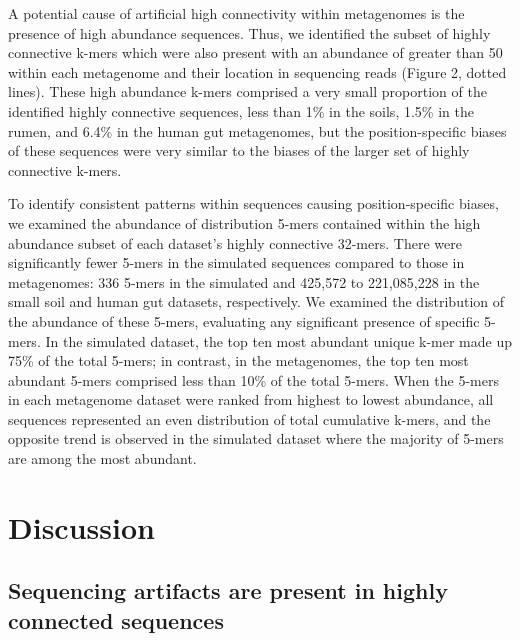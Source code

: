\documentclass[10pt]{article}
\begin{document}
A potential cause of artificial high connectivity within metagenomes is the presence of high abundance sequences.  Thus, we identified the subset of highly connective k-mers which were also present with an abundance of greater than 50 within each metagenome and their location in sequencing reads (Figure 2, dotted lines).   These high abundance k-mers comprised a very small proportion of the identified highly connective sequences, less than 1\% in the soils, 1.5\% in the rumen, and 6.4\% in the human gut metagenomes, but the position-specific biases of these sequences were very similar to the biases of the larger set of highly connective k-mers.

To identify consistent patterns within sequences causing position-specific biases, we examined the abundance of distribution 5-mers contained within the high abundance subset of each dataset's highly connective 32-mers.   There were significantly fewer 5-mers in the simulated sequences compared to those in metagenomes: 336 5-mers in the simulated and 425,572 to 221,085,228 in the small soil and human gut datasets, respectively.  We examined the distribution of the abundance of these 5-mers, evaluating any significant presence of specific 5-mers.  In the simulated dataset, the top ten most abundant unique k-mer made up 75\% of the total 5-mers; in contrast, in the metagenomes, the top ten most abundant 5-mers comprised less than 10\% of the total 5-mers.  When the 5-mers in each metagenome dataset were ranked from highest to lowest abundance, all sequences represented an even distribution of total cumulative k-mers, and the opposite trend is observed in the simulated dataset where the majority of 5-mers are among the most abundant.

\section*{Discussion}

\subsection*{Sequencing artifacts are present in highly connected sequences}
\end{document}
